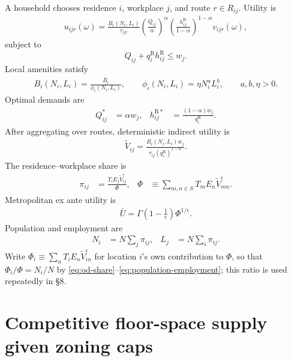 \documentclass[12pt,a4paper]{article}
\newcommand{\R}{\mathrm{R}}
\newcommand{\1}{\mathbb 1}
\begin{document}
A household chooses residence $i$, workplace $j$, and route $r\in R_{ij}$. Utility is
\begin{align}
u_{ijr}(\omega)
=
\frac{B_i(N_i,L_i)}{\tau_{ijr}}
\left(\frac{Q_{ij}}{\alpha}\right)^{\alpha}
\left(\frac{h_{ij}^{\R}}{1-\alpha}\right)^{1-\alpha}
v_{ijr}(\omega),
\label{eq:household-utility}
\end{align}
subject to
\[
Q_{ij}+q_i^{\R}h_{ij}^{\R}\leq w_j.
\]
Local amenities satisfy
\begin{align}
B_i(N_i,L_i)
=
\frac{\bar B_i}{\phi_i(N_i,L_i)},
\qquad
\phi_i(N_i,L_i)=\eta N_i^aL_i^b,
\qquad a,b,\eta>0.
\label{eq:amenity}
\end{align}
Optimal demands are
\begin{align}
Q_{ij}^*&=\alpha w_j,
&
h_{ij}^{\R*}&=\frac{(1-\alpha)w_j}{q_i^{\R}}.
\label{eq:household-demands}
\end{align}
After aggregating over routes, deterministic indirect utility is
\begin{align}
\widetilde V_{ij}
=
\frac{B_i(N_i,L_i)w_j}
{\tau_{ij}(q_i^{\R})^{1-\alpha}}.
\label{eq:indirect-utility}
\end{align}
The residence--workplace share is
\begin{align}
\pi_{ij}
&=
\frac{T_iE_j\widetilde V_{ij}^{\epsilon}}{\Phi},
&
\Phi
&\equiv
\sum_{m,n\in S}T_mE_n\widetilde V_{mn}^{\epsilon}.
\label{eq:od-share}
\end{align}
Metropolitan ex ante utility is
\begin{align}
\bar U
=
\Gamma\!\left(1-\frac1\epsilon\right)\Phi^{1/\epsilon}.
\label{eq:expected-utility}
\end{align}
Population and employment are
\begin{align}
N_i&=N\sum_j\pi_{ij},
&
L_j&=N\sum_i\pi_{ij}.
\label{eq:population-employment}
\end{align}
Write $\Phi_i\equiv\sum_nT_iE_n\widetilde V_{in}^\epsilon$ for location $i$'s own contribution to $\Phi$, so that $\Phi_i/\Phi=N_i/N$ by \eqref{eq:od-share}--\eqref{eq:population-employment}; this ratio is used repeatedly in \S8.

\section{Competitive floor-space supply given zoning caps}
\end{document}
